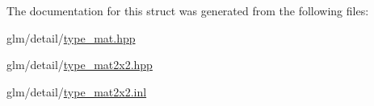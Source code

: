The documentation for this struct was generated from the following files\-:\begin{DoxyCompactItemize}
\item 
glm/detail/\hyperlink{type__mat_8hpp}{type\-\_\-mat.\-hpp}\item 
glm/detail/\hyperlink{type__mat2x2_8hpp}{type\-\_\-mat2x2.\-hpp}\item 
glm/detail/\hyperlink{type__mat2x2_8inl}{type\-\_\-mat2x2.\-inl}\end{DoxyCompactItemize}

